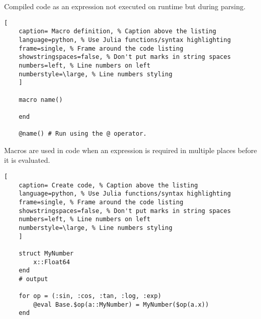 \documentclass[11pt]{scrartcl} %
\begin{document}
Compiled code as an expression not executed on runtime but during parsing.

\begin{lstlisting}[
	caption= Macro definition, % Caption above the listing
	language=python, % Use Julia functions/syntax highlighting
	frame=single, % Frame around the code listing
	showstringspaces=false, % Don't put marks in string spaces
	numbers=left, % Line numbers on left
	numberstyle=\large, % Line numbers styling
	]

	macro name()

	end

	@name() # Run using the @ operator.

\end{lstlisting}

Macros are used in code when an expression is required in multiple places before it is evaluated.

\begin{lstlisting}[
	caption= Create code, % Caption above the listing
	language=python, % Use Julia functions/syntax highlighting
	frame=single, % Frame around the code listing
	showstringspaces=false, % Don't put marks in string spaces
	numbers=left, % Line numbers on left
	numberstyle=\large, % Line numbers styling
	]

	struct MyNumber
    	x::Float64
	end
	# output

	for op = (:sin, :cos, :tan, :log, :exp)
    	@eval Base.$op(a::MyNumber) = MyNumber($op(a.x))
	end

\end{lstlisting}



\end{document}
